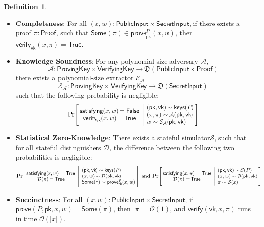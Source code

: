 \documentclass[a4paper]{article}
\theoremstyle{definition}
\newtheorem{definition}{Definition}[subsection]
\renewcommand{\abs}[1]{\left|#1\right|}
\newcommand{\False}{{\textsf{False}}}
\newcommand{\Proof}{{\textsf{Proof}}}
\newcommand{\ProvingKey}{{\textsf{ProvingKey}}}
\newcommand{\PublicInput}{{\textsf{PublicInput}}}
\newcommand{\SecretInput}{{\textsf{SecretInput}}}
\newcommand{\Some}{{\textsf{Some}}}
\newcommand{\True}{{\textsf{True}}}
\newcommand{\VerifyingKey}{{\textsf{VerifyingKey}}}
\newcommand{\keys}{{\textsf{keys}}}
\newcommand{\pk}{{\textsf{pk}}}
\newcommand{\prove}{{\textsf{prove}}}
\newcommand{\satisfying}{{\textsf{satisfying}}}
\newcommand{\verify}{{\textsf{verify}}}
\newcommand{\vk}{{\textsf{vk}}}
\begin{document}
\begin{definition}
    \begin{itemize}
        \item \textbf{Completeness}: For all $(x, w) : \PublicInput \times \SecretInput$, if there exists a proof $\pi : \Proof$, such that $\Some(\pi) \in \prove^P_\pk(x, w)$, then $\verify_\vk(x, \pi) = \True$.
        \item \textbf{Knowledge Soundness}: For any polynomial-size adversary $\mathcal{A}$,
            \[\mathcal{A} : \ProvingKey \times \VerifyingKey \to \mathfrak{D}(\PublicInput \times \Proof)\]
             there exists a polynomial-size extractor $\mathcal{E}_\mathcal{A}$
            \[\mathcal{E}_\mathcal{A} : \ProvingKey \times \VerifyingKey \to \mathfrak{D}(\SecretInput)\]
            such that the following probability is negligible:
            \[
                \Prob{
                    \satisfying(x, w) = \False \\
                    \verify_\vk(x, w) = \True
                }{
                    (\pk, \vk) \sim \keys(P) \\
                    (x, \pi) \sim \mathcal{A}(\pk, \vk) \\
                    w \sim \mathcal{E}_\mathcal{A}(\pk, \vk)
                }
            \]
        \item \textbf{Statistical Zero-Knowledge}: There exists a stateful simulator$\mathcal{S}$, such that for all stateful distinguishers $\mathcal{D}$, the difference between the following two probabilities is negligible:
            \[
                \Prob{
                    \satisfying(x, w) = \True \\
                    \mathcal{D}(\pi) = \True
                }{
                    (\pk, \vk) \sim \keys(P) \\
                    (x, w) \sim \mathcal{D}(\pk, \vk) \\
                    \Some(\pi) \sim \prove^P_\pk(x, w)
                }
                \,\,\text{and}\,\,
                \Prob{
                    \satisfying(x, w) = \True \\
                    \mathcal{D}(\pi) = \True
                }{
                    (\pk, \vk) \sim \mathcal{S}(P) \\
                    (x, w) \sim \mathcal{D}(\pk, \vk) \\
                    \pi \sim \mathcal{S}(x)
                }
            \]
        \item \textbf{Succinctness}: For all $(x, w) : \PublicInput \times \SecretInput$, if $\prove(P, \pk, x, w) = \Some(\pi)$, then $\abs{\pi} = \mathcal{O}(1)$, and $\verify(\vk, x, \pi)$ runs in time $\mathcal{O}(\abs{x})$.
    \end{itemize}
\end{definition}
\end{document}
